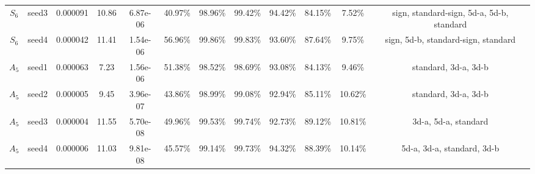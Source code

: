 \begin{tabular}{cccccccccccc}
  $S_{6}$ & seed3 &   0.000091 &     10.86 &  6.87e-06 &   40.97\% &   98.96\% &   99.42\% &   94.42\% & 84.15\% &             7.52\% &              sign, standard-sign, 5d-a, 5d-b, standard \\
  $S_{6}$ & seed4 &   0.000042 &     11.41 &  1.54e-06 &   56.96\% &   99.86\% &   99.83\% &   93.60\% & 87.64\% &             9.75\% &                    sign, 5d-b, standard-sign, standard \\
  $A_{5}$ & seed1 &   0.000063 &      7.23 &  1.56e-06 &   51.38\% &   98.52\% &   98.69\% &   93.08\% & 84.13\% &             9.46\% &                                   standard, 3d-a, 3d-b \\
  $A_{5}$ & seed2 &   0.000005 &      9.45 &  3.96e-07 &   43.86\% &   98.99\% &   99.08\% &   92.94\% & 85.11\% &            10.62\% &                                   standard, 3d-a, 3d-b \\
  $A_{5}$ & seed3 &   0.000004 &     11.55 &  5.70e-08 &   49.96\% &   99.53\% &   99.74\% &   92.73\% & 89.12\% &            10.81\% &                                   3d-a, 5d-a, standard \\
  $A_{5}$ & seed4 &   0.000006 &     11.03 &  9.81e-08 &   45.57\% &   99.14\% &   99.73\% &   94.32\% & 88.39\% &            10.14\% &                             5d-a, 3d-a, standard, 3d-b \\
\bottomrule
\end{tabular}
